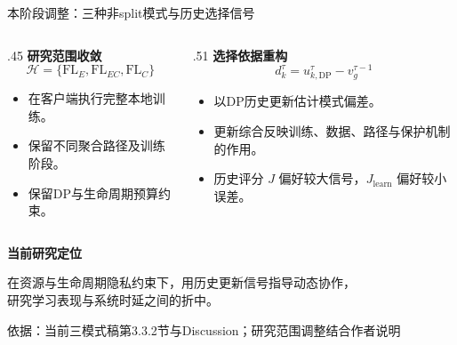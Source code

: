 \documentclass[aspectratio=169,11pt]{beamer}
\newcommand{\FlE}{\mathrm{FL}_{E}}
\newcommand{\FlEC}{\mathrm{FL}_{EC}}
\newcommand{\FlC}{\mathrm{FL}_{C}}
\newcommand{\key}[1]{{\color{Teal}\bfseries #1}}
\newcommand{\src}[1]{\vfill{\color{Gray}\fontsize{7.5}{9}\selectfont 依据：#1\par}}
\newcommand{\tight}{\setlength{\itemsep}{.18cm}}
\begin{document}
\begin{frame}{本阶段调整：三种非split模式与历史选择信号}
\begin{columns}[T,onlytextwidth]
\begin{column}{.45\textwidth}
\key{研究范围收敛}
\[
\mathcal H=\{\FlE,\FlEC,\FlC\}
\]
\begin{itemize}\tight
\item 在客户端执行完整本地训练。
\item 保留不同聚合路径及训练阶段。
\item 保留DP与生命周期预算约束。
\end{itemize}
\end{column}
\begin{column}{.51\textwidth}
\key{选择依据重构}
\[
d_k^\tau=u_{k,\mathrm{DP}}^\tau-v_g^{\tau-1}
\]
\begin{itemize}\tight
\item 以DP历史更新估计模式偏差。
\item 更新综合反映训练、数据、路径与保护机制的作用。
\item 历史评分 $J$ 偏好较大信号，$J_{\mathrm{learn}}$ 偏好较小误差。
\end{itemize}
\end{column}
\end{columns}
\par\vspace{.22cm}
\key{当前研究定位}\par
在资源与生命周期隐私约束下，用历史更新信号指导动态协作，\\
研究学习表现与系统时延之间的折中。
\src{当前三模式稿第3.3.2节与Discussion；研究范围调整结合作者说明}
\end{frame}
\end{document}
